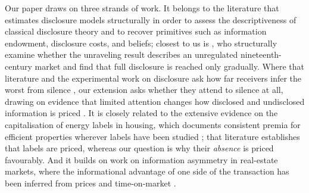 Our paper draws on three strands of work. It belongs to the literature that estimates
disclosure models structurally in order to assess the descriptiveness of classical disclosure
theory and to recover primitives such as information endowment, disclosure costs, and beliefs;
closest to us is \citet{bourveau_learning_2025}, who structurally examine whether the unraveling
result describes an unregulated nineteenth-century market and find that full disclosure is
reached only gradually. Where that literature and the experimental work on disclosure ask how far
receivers infer the worst from silence \citep{jin_is_2021, hagenbach_motivated_2025}, our extension
asks whether they attend to silence at all, drawing on evidence that limited attention changes how
disclosed and undisclosed information is priced \citep{hirshleifer_limited_2003, dellavigna_investor_2009}.
It is closely related to the extensive evidence on the capitalisation of energy labels in
housing, which documents consistent premia for efficient properties wherever labels have been
studied \citep{brounen_kok_2011, hyland_lyons_2013, fuerst_energy_2016, frondel_power_2018,
myers_mandatory_2022}; that literature establishes that labels are priced, whereas our question
is why their \emph{absence} is priced favourably. And it builds on work on information
asymmetry in real-estate markets, where the informational advantage of one side of the
transaction has been inferred from prices and time-on-market \citep{levitt_syverson_2008,
lizzeri_1999}.
